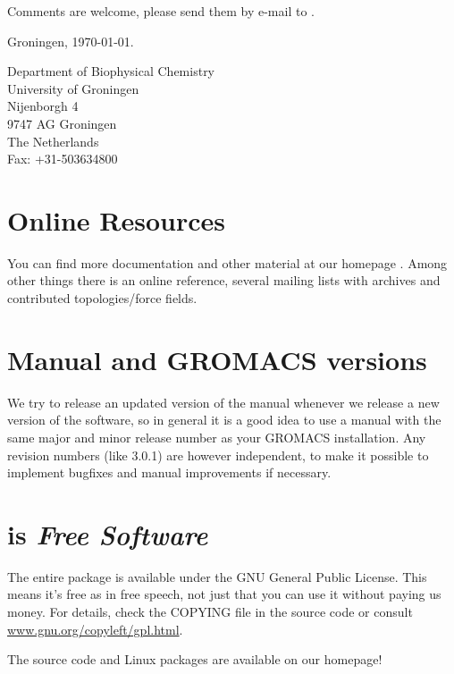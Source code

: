 \documentclass[11pt,a4paper,twoside]{gmxmanual}
\begin{document}
Comments are welcome, please send them by e-mail to {\email}.
\medskip

Groningen, \today.
\medskip

Department of Biophysical Chemistry \\
University of Groningen \\ 
Nijenborgh 4                            \\
9747 AG Groningen                       \\
The Netherlands                         \\
Fax: +31-503634800

\newpage
\section*{Online Resources}
You can find more documentation and other material 
at our homepage \wwwpage. Among other things there is
 an online reference,
several {\gromacs} mailing lists with archives and contributed 
topologies/force fields. 


\section*{Manual and GROMACS versions}
We try to release an updated version of the manual whenever
we release a new version of the software, so in general 
it is a good idea to use a manual with the same major and
minor release number as your GROMACS installation. 
Any revision numbers (like 3.0.1) are however independent, 
to make it possible to implement bugfixes and manual
improvements if necessary. 


\section*{{\gromacs} is {\em Free Software}}
The entire {\gromacs} package is available under the GNU 
General Public License. This means it's free as 
in free speech, not just that you can use it without
paying us money. For details, check the COPYING file in the source code
or consult 
\href{http://www.gnu.org/copyleft/gpl.html}{www.gnu.org/copyleft/gpl.html}.

The {\gromacs} source code and 
Linux packages are available on our homepage!


\vspace{0.5cm}

%
%
\tableofcontents
\end{document}
